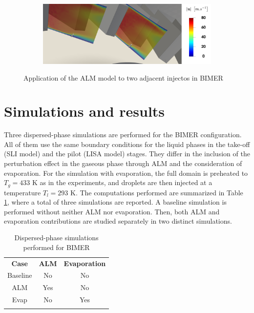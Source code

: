 \begin{figure}[ht]
\centering
\begin{subfigure}[b]{1.0\textwidth}
	\centering
   \includegraphics[scale=0.18]{./part3_applications/figures_ch9_lagrangian/turbulent_structures/ALM_revolution}
\end{subfigure}
   \caption{Application of the ALM model to two adjacent injectos in BIMER}
\label{fig:BIMER_ALM_revolution}
\end{figure}

\section{Simulations and results}
\label{sec:BIMER_LGS_simus_and_results}

Three dispersed-phase simulations are performed for the BIMER configuration. All of them use the same boundary conditions for the liquid phases in the take-off (SLI model) and the pilot (LISA model) stages. They differ in the inclusion of the perturbation effect in the gaseous phase through ALM and the consideration of evaporation. For the simulation with evaporation, the full domain is preheated to $T_g = 433$ K as in the experiments, and droplets are then injected at a temperature $T_l = 293 $ K.  The computations performed are summarized in Table \ref{tab:BIMER_dispersed_phase_simulations_performed}, where a total of three simulations are reported. A baseline simulation is performed without neither ALM nor evaporation. Then, both ALM and evaporation contributions are studied separately in two distinct simulations.

\begin{table}[!h]
\centering
\caption{Dispersed-phase simulations performed for BIMER}
\begin{tabular}{ccc}
\thickhline
\textbf{Case} & \textbf{ALM} & \textbf{Evaporation} \\
\thickhline
Baseline & No & No \\
ALM & Yes & No \\
Evap & No & Yes \\%
\thickhline
\end{tabular}
\label{tab:BIMER_dispersed_phase_simulations_performed}
\end{table}


